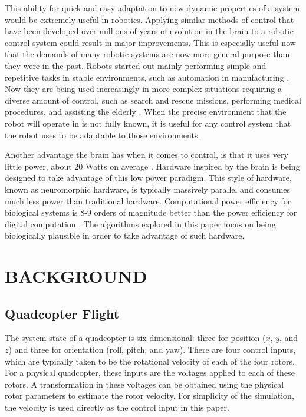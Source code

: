 \documentclass[letterpaper, 10 pt, conference]{ieeeconf}  %
\begin{document}
This ability for quick and easy adaptation to new dynamic properties of a system would be extremely useful in robotics. 
Applying similar methods of control that have been developed over millions of years of evolution in the brain to a robotic control system could result in major improvements. 
This is especially useful now that the demands of many robotic systems are now more general purpose than they were in the past. 
Robots started out mainly performing simple and repetitive tasks in stable environments, such as automation in manufacturing \cite{garcia2007evolution}. 
Now they are being used increasingly in more complex situations requiring a diverse amount of control, such as search and rescue missions, performing medical procedures, and assisting the elderly \cite{garcia2007evolution, hockstein2007history, nourbakhsh2005human, lacey1998application}. 
When the precise environment that the robot will operate in is not fully known, it is useful for any control system that the robot uses to be adaptable to those environments.

Another advantage the brain has when it comes to control, is that it uses very little power, about 20 Watts on average \cite{hart1975brain}.
Hardware inspired by the brain is being designed to take advantage of this low power paradigm. 
This style of hardware, known as neuromorphic hardware, is typically massively parallel and consumes much less power than traditional hardware.
Computational power efficiency for biological systems is 8-9 orders of magnitude better than the power efficiency for digital computation \cite{hasler2013finding}.
The algorithms explored in this paper focus on being biologically plausible in order to take advantage of such hardware.

\section{BACKGROUND}

\subsection{Quadcopter Flight}

The system state of a quadcopter is six dimensional: three for position ($x$, $y$, and $z$) and three for orientation (roll, pitch, and yaw). 
There are four control inputs, which are typically taken to be the rotational velocity of each of the four rotors. 
For a physical quadcopter, these inputs are the voltages applied to each of these rotors.
A transformation in these voltages can be obtained using the physical rotor parameters to estimate the rotor velocity.
For simplicity of the simulation, the velocity is used directly as the control input in this paper. 
\end{document}

